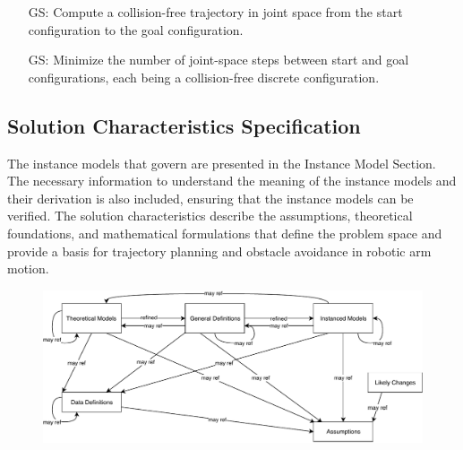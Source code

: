 \documentclass[12pt]{article}
\newcounter{goalnum} %
\begin{document}
\begin{itemize}

\item[GS\refstepcounter{goalnum}\thegoalnum \label{GS_CollisionFreePath}:] Compute a collision-free trajectory in joint space from the start configuration to the goal configuration.

\item[GS\refstepcounter{goalnum}\thegoalnum \label{GS_OptimizePath}:] Minimize the number of joint-space steps between start and goal configurations, each being a collision-free discrete configuration.



\end{itemize}

\subsection{Solution Characteristics Specification}

The instance models that govern \progname{} are presented in the Instance Model Section. The necessary information to understand the meaning of the instance models and their derivation is also included, ensuring that the instance models can be verified. The solution characteristics describe the assumptions, theoretical foundations, and mathematical formulations that define the problem space and provide a basis for trajectory planning and obstacle avoidance in robotic arm motion.


\begin{figure}[H]
  \includegraphics[scale=0.9]{RelationsBetweenTM_GD_IM_DD_A.pdf}
\end{figure}
\end{document}
